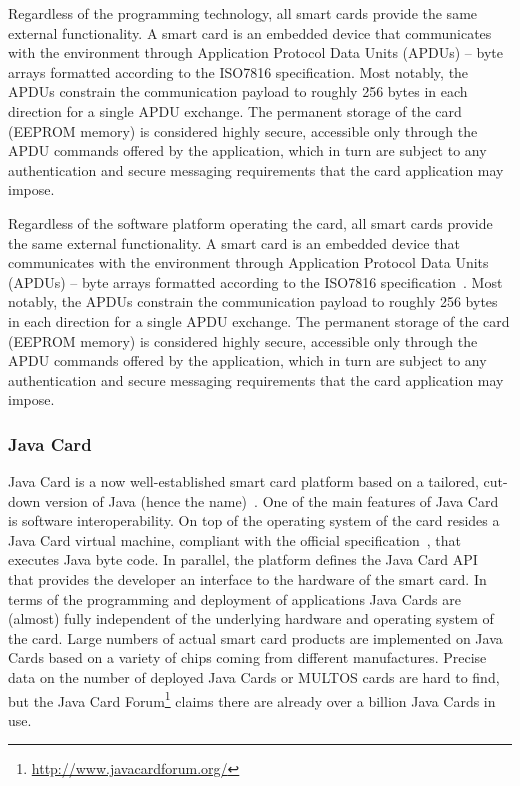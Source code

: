 Regardless of the programming technology, all smart cards provide the
same external functionality. A smart card is an embedded device that
communicates with the environment through Application Protocol Data
Units (APDUs) -- byte arrays formatted according to the ISO7816
specification.  Most notably, the APDUs constrain the communication
payload to roughly 256 bytes in each direction for a single APDU exchange.
The permanent storage
of the card (EEPROM memory) is considered highly secure, accessible
only through the APDU commands offered by the application, which in
turn are subject to any authentication and secure messaging
requirements that the card application may impose.

Regardless of the software platform operating the card, all smart cards provide
the same external functionality. A smart card is an embedded device that
communicates with the environment through Application Protocol Data Units
(APDUs) -- byte arrays formatted according to the ISO7816
specification~\cite{ISO7816_4}. Most notably, the APDUs constrain the
communication payload to roughly 256 bytes in each direction for a single APDU
exchange. The permanent storage of the card (EEPROM memory) is considered
highly secure, accessible only through the APDU commands offered by the
application, which in turn are subject to any authentication and secure
messaging requirements that the card application may impose.

\subsubsection{Java Card}\label{sec:javacard}

Java Card is a now well-established smart card platform based on a
tailored, cut-down version of Java (hence the name)~\cite{Chen00}. One
of the main features of Java Card is software interoperability. On top
of the operating system of the card resides a Java Card virtual
machine, compliant with the official specification~\cite{jcvm222}, that
executes Java byte code. In parallel, the platform defines
the Java Card API~\cite{jcapi222} that provides the developer an interface
to the hardware of the smart card.
In terms of the programming and deployment of applications
Java Cards are (almost) fully independent of the underlying hardware
and operating system of the card. Large numbers of actual smart card
products are implemented on Java Cards based on a variety of chips
coming from different manufactures. Precise data on the number of deployed
Java Cards or MULTOS cards are hard to find, but the
Java Card Forum\footnote{\url{http://www.javacardforum.org/}}
claims there are already over a billion Java Cards in use.

